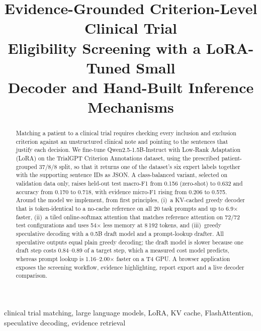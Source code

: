 \documentclass[conference]{IEEEtran}
\begin{document}
\title{Evidence-Grounded Criterion-Level Clinical Trial\\Eligibility Screening with a LoRA-Tuned Small\\Decoder and Hand-Built Inference Mechanisms}

\author{
}

\maketitle

\begin{abstract}
Matching a patient to a clinical trial requires checking every inclusion and exclusion criterion against an unstructured clinical note and pointing to the sentences that justify each decision. We fine-tune Qwen2.5-1.5B-Instruct with Low-Rank Adaptation (LoRA) on the TrialGPT Criterion Annotations dataset, using the prescribed patient-grouped 37/8/8 split, so that it returns one of the dataset's six expert labels together with the supporting sentence IDs as JSON. A class-balanced variant, selected on validation data only, raises held-out test macro-F1 from 0.156 (zero-shot) to 0.632 and accuracy from 0.170 to 0.718, with evidence micro-F1 rising from 0.206 to 0.575. Around the model we implement, from first principles, (i)~a KV-cached greedy decoder that is token-identical to a no-cache reference on all 20 task prompts and up to 6.9$\times$ faster, (ii)~a tiled online-softmax attention that matches reference attention on 72/72 test configurations and uses 54$\times$ less memory at 8\,192 tokens, and (iii)~greedy speculative decoding with a 0.5B draft model and a prompt-lookup drafter. All speculative outputs equal plain greedy decoding; the draft model is slower because one draft step costs 0.84--0.89 of a target step, which a measured cost model predicts, whereas prompt lookup is 1.16--2.00$\times$ faster on a T4 GPU. A browser application exposes the screening workflow, evidence highlighting, report export and a live decoder comparison.
\end{abstract}

\begin{IEEEkeywords}
clinical trial matching, large language models, LoRA, KV cache, FlashAttention, speculative decoding, evidence retrieval
\end{IEEEkeywords}
\end{document}
